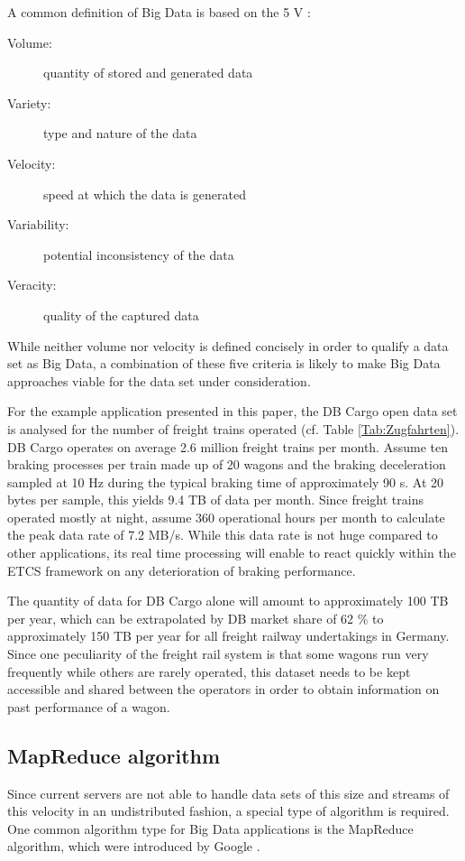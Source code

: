 \documentclass[a4paper, 12pt]{scrartcl}
\begin{document}
A common definition of Big Data is based on the 5 V \cite{hilbert2016big}:
\begin{description}
	\item[Volume:] quantity of stored and generated data 
	\item[Variety:] type and nature of the data
	\item[Velocity:] speed at which the data is generated
	\item[Variability:] potential inconsistency of the data
	\item[Veracity:] quality of the captured data
\end{description}
While neither volume nor velocity is defined concisely in order to qualify a data set as Big Data, a combination of these five criteria is likely to make Big Data approaches viable for the data set under consideration.

For the example application presented in this paper, the DB Cargo open data set \cite{DBOpenDataZug} is analysed for the number of freight trains operated (cf. Table \ref{Tab:Zugfahrten}). DB Cargo operates on average 2.6 million freight trains per month. Assume ten braking processes per train made up of 20 wagons and the braking deceleration sampled at 10 Hz during the typical braking time of approximately 90 s. At 20 bytes per sample, this yields 9.4 TB of data per month. Since freight trains operated mostly at night, assume 360 operational hours per month to calculate the peak data rate of 7.2 MB/s. While this data rate is not huge compared to other applications, its real time processing will enable to react quickly within the ETCS framework on any deterioration of braking performance.

The quantity of data for DB Cargo alone will amount to approximately 100 TB per year, which can be extrapolated by DB market share of 62 \% to approximately 150 TB per year for all freight railway undertakings in Germany. Since one peculiarity of the freight rail system is that some wagons run very frequently while others are rarely operated, this dataset needs to be kept accessible and shared between the operators in order to obtain  information on past performance of a wagon.

\subsection{MapReduce algorithm}
Since current servers are not able to handle data sets of this size and streams of this velocity in an undistributed fashion, a special type of algorithm is required. One common algorithm type for Big Data applications is the MapReduce algorithm, which were introduced by Google \cite{dean2008mapreduce}.
\end{document}
